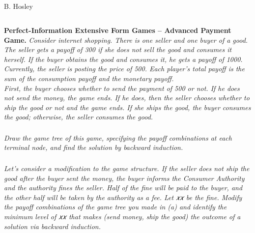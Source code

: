 \documentclass[12pt]{amsart}
\begin{document}
\raggedbottom

\hspace{\fill} {\large B. Hosley}
\bigskip



\subsection{}
\textbf{Perfect-Information Extensive Form Games – Advanced Payment Game.}\textit{ Consider
	internet shopping. There is one seller and one buyer of a good. The seller gets a payoff of
	300 if she does not sell the good and consumes it herself. If the buyer obtains the good and
	consumes it, he gets a payoff of 1000. Currently, the seller is posting the price of 500. Each
	player’s total payoff is the sum of the consumption payoff and the monetary payoff.} \\

\textit{First, the buyer chooses whether to send the payment of 500 or not. If he does not send
	the money, the game ends. If he does, then the seller chooses whether to ship the good or
	not and the game ends. If she ships the good, the buyer consumes the good; otherwise, the
	seller consumes the good.}

\subsubsection{}
\textit{Draw the game tree of this game, specifying the payoff combinations at each terminal
	node, and find the solution by backward induction.}

\subsubsection{}
\textit{Let’s consider a modification to the game structure. If the seller does not ship the good
	after the buyer sent the money, the buyer informs the Consumer Authority and the
	authority fines the seller. Half of the fine will be paid to the buyer, and the other half
	will be taken by the authority as a fee. Let 𝑥𝑥 be the fine. Modify the payoff
	combinations of the game tree you made in (a) and identify the minimum level of 𝑥𝑥 that
	makes (send money, ship the good) the outcome of a solution via backward
	induction.}
\end{document}

